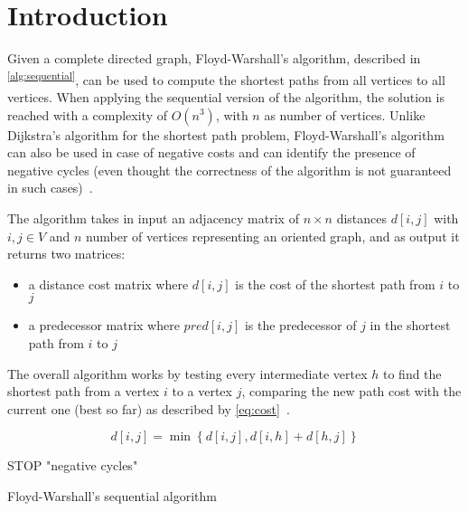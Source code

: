 \section{Introduction}\label{introduction}

Given a complete directed  graph, Floyd-Warshall's algorithm, described in \textsuperscript{\ref{alg:sequential}}, can be used to compute the shortest paths from all vertices to all vertices.
When applying the sequential version of the algorithm, the solution is reached with a complexity of \(O(n^3)\), with \(n\) as number of vertices.
Unlike Dijkstra's algorithm for the shortest path problem, Floyd-Warshall's algorithm can also be used in case of negative costs and can identify the presence of negative cycles 
(even thought the correctness of the algorithm is not guaranteed in such cases)~\cite{fischetti}.

The algorithm takes in input an adjacency matrix of $n \times n$  distances $d[i,j]$ with $i,j \in V$ and $n$ number of vertices representing an oriented graph, and as output it returns two matrices:
\begin{itemize}
    \item a distance cost matrix where \(d[i,j]\) is the cost of the shortest path from \(i\) to \(j\)
    \item a predecessor matrix where \(pred[i,j]\) is the predecessor of \(j\) in the shortest path from \(i\) to \(j\)
  \end{itemize}

The overall algorithm works by testing every intermediate vertex \(h\) to find the shortest path from a vertex \(i\) to a vertex \(j\),
comparing the new path cost with the current one (best so far) as described by \cref{eq:cost}~\cite{fischetti}.

\begin{equation} \label{eq:cost}
    d[i,j] = \min\left\{ d[i,j], d[i,h]+d[h,j] \right\}
\end{equation}

\begin{algorithm}
     {
         {
        }
         {
             {
                STOP  "negative cycles"
            }
        }
    }
\caption{Floyd-Warshall's sequential algorithm}
\label{alg:sequential}
\end{algorithm}

